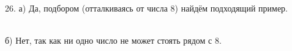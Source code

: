 26. а) Да, подбором (отталкиваясь от числа 8) найдём подходящий пример.
\begin{figure}[ht!]
\end{figure}\\
б) Нет, так как ни одно число не может стоять рядом с 8.\\
